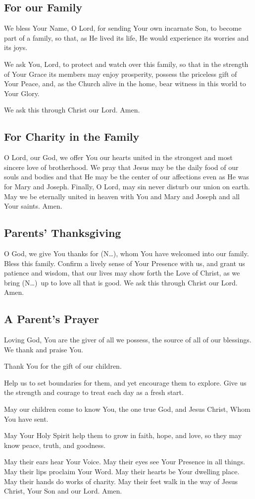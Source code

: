 \documentclass[12pt]{article}
\newcommand{\prayertitle}[1]{\subsection{#1}}
\newcommand{\insertname}{(N\dots)\xspace}
\begin{document}
\prayertitle{For our Family}
We bless Your Name, O Lord, for sending Your own incarnate Son, to become part of a family, so that, as He lived its life, He would experience its worries and its joys.

We ask You, Lord, to protect and watch over this family, so that in the strength of Your Grace its members may enjoy prosperity, possess the priceless gift of Your Peace, and, as the Church alive in the home, bear witness in this world to Your Glory.

We ask this through Christ our Lord.
Amen.
\newpage
\prayertitle{For Charity in the Family}
O Lord, our God, we offer You our hearts united in the strongest and most sincere love of brotherhood.
We pray that Jesus may be the daily food of our souls and bodies and that He may be the center of our affections even as He was for Mary and Joseph.
Finally, O Lord, may sin never disturb our union on earth.
May we be eternally united in heaven with You and Mary and Joseph and all Your saints.
Amen.

\prayertitle{Parents' Thanksgiving}
O God, we give You thanks for \insertname, whom You have welcomed into our family.
Bless this family.
Confirm a lively sense of Your Presence with us, and grant us patience and wisdom, that our lives may show forth the Love of Christ, as we bring \insertname\ up to love all that is good.
We ask this through Christ our Lord.
Amen.

\prayertitle{A Parent's Prayer}
\label{prayer:parent}
Loving God, You are the giver of all we possess, the source of all of our blessings.
We thank and praise You.

Thank You for the gift of our children.

Help us to set boundaries for them, and yet encourage them to explore.
Give us the strength and courage to treat each day as a fresh start.

May our children come to know You, the one true God, and Jesus Christ, Whom You have sent.

May Your Holy Spirit help them to grow in faith, hope, and love, so they may know peace, truth, and goodness.

May their ears hear Your Voice.
May their eyes see Your Presence in all things.
May their lips proclaim Your Word.
May their hearts be Your dwelling place.
May their hands do works of charity.
May their feet walk in the way of Jesus Christ, Your Son and our Lord.
Amen.
\end{document}
